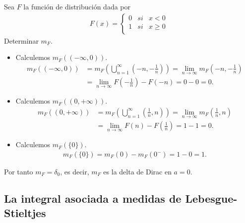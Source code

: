 \begin{ejemplo}
Sea $F$ la función de distribución dada por
\begin{align*}
    F(x) = \left\{ \begin{array}{lcc}
             0 &  si  & x < 0\\
             1 &  si  & x \ge 0\\
             \end{array}
        \right. 
\end{align*}
Determinar $m_F$.
\begin{itemize}
    \item Calculemos $m_F((-\infty,0))$.
    \begin{align*}
        m_F((-\infty,0)) &= m_F\left( \bigcup_{n=1}^{\infty}\left( -n, -\frac{1}{n}\right)\right) = \lim_{n \to \infty}{m_F}\left( -n, -\frac{1}{n}\right) \\
        &= \lim_{n \to \infty}{F\left(-\frac{1}{n}\right) - F(-n)} = 0 - 0 = 0.
    \end{align*}
    \item Calculemos $m_F((0,+\infty))$.
    \begin{align*}
        m_F((0,+\infty)) &= m_F\left( \bigcup_{n=1}^{\infty}\left(\frac{1}{n}, n\right)\right) = \lim_{n \to \infty}{m_F}\left(\frac{1}{n}, n\right) \\
        &= \lim_{n \to \infty}{F(n) - F\left(\frac{1}{n}\right)} = 1 - 1 = 0 .
    \end{align*}
    \item Calculemos $m_F(\{0\})$.
    \begin{align*}
        m_F(\{0\}) = m_F(0) - m_F(0^-) = 1 - 0 = 1.
    \end{align*}
\end{itemize}
Por tanto $m_F = \delta_0$, es decir, $m_F$ es la delta de Dirac en $a = 0$.
\end{ejemplo}

\subsection{La integral asociada a medidas de Lebesgue-Stieltjes}

